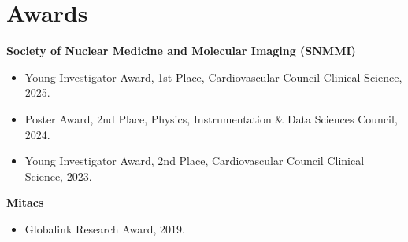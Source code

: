 \section{Awards}
\textbf{Society of Nuclear Medicine and Molecular Imaging (SNMMI)}
\begin{itemize}[leftmargin=*]
\item Young Investigator Award, 1st Place, Cardiovascular Council Clinical Science, 2025.
\item Poster Award, 2nd Place, Physics, Instrumentation \& Data Sciences Council, 2024.
\item Young Investigator Award, 2nd Place, Cardiovascular Council Clinical Science, 2023.
\end{itemize}

\textbf{Mitacs}
\begin{itemize}[leftmargin=*]
\item Globalink Research Award, 2019.
\end{itemize}